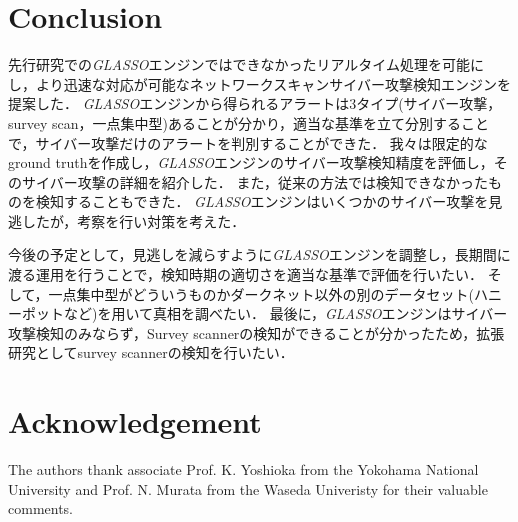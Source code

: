 \documentclass[conference]{IEEEtran}
\begin{document}
\section{Conclusion}
先行研究での{\it GLASSO}エンジンではできなかったリアルタイム処理を可能にし，より迅速な対応が可能なネットワークスキャンサイバー攻撃検知エンジンを提案した．
{\it GLASSO}エンジンから得られるアラートは3タイプ(サイバー攻撃，survey scan，一点集中型)あることが分かり，適当な基準を立て分別することで，サイバー攻撃だけのアラートを判別することができた．
我々は限定的なground truthを作成し，{\it GLASSO}エンジンのサイバー攻撃検知精度を評価し，そのサイバー攻撃の詳細を紹介した．
また，従来の方法では検知できなかったものを検知することもできた．
{\it GLASSO}エンジンはいくつかのサイバー攻撃を見逃したが，考察を行い対策を考えた．

今後の予定として，見逃しを減らすように{\it GLASSO}エンジンを調整し，長期間に渡る運用を行うことで，検知時期の適切さを適当な基準で評価を行いたい．
そして，一点集中型がどういうものかダークネット以外の別のデータセット(ハニーポットなど)を用いて真相を調べたい．
最後に，{\it GLASSO}エンジンはサイバー攻撃検知のみならず，Survey scannerの検知ができることが分かったため，拡張研究としてsurvey scannerの検知を行いたい．



\section*{Acknowledgement}
The authors thank associate Prof. K. Yoshioka from the Yokohama National University and  Prof. N. Murata from the Waseda Univeristy for their valuable comments.
\end{document}
